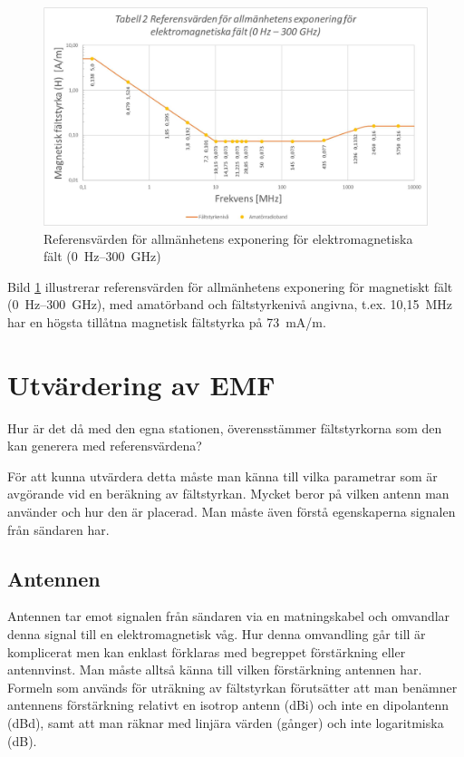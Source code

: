 \begin{figure}[h]
\begin{center}
\includegraphics[width=14cm]{images/emfbild-001}
\caption{Referensvärden för allmänhetens exponering för elektromagnetiska fält (0~Hz--300~GHz)}
\label{fig:emf2}
\end{center}
\end{figure}

Bild \ref{fig:emf2} illustrerar referensvärden för allmänhetens
exponering för magnetiskt fält (0~Hz--300~GHz), med amatörband
och fältstyrkenivå angivna, t.ex. 10,15~MHz har en högsta tillåtna
magnetisk fältstyrka på 73~mA/m.

\section{Utvärdering av EMF}

Hur är det då med den egna stationen, överensstämmer fältstyrkorna som
den kan generera med referensvärdena?

För att kunna utvärdera detta måste man känna till vilka parametrar
som är avgörande vid en beräkning av fältstyrkan.
Mycket beror på vilken antenn man använder och hur den är placerad.
Man måste även förstå egenskaperna signalen från sändaren har.

\subsection{Antennen}

Antennen tar emot signalen från sändaren via en matningskabel och
omvandlar denna signal till en elektromagnetisk våg.
Hur denna omvandling går till är komplicerat men kan enklast förklaras med
begreppet förstärkning eller antennvinst.
Man måste alltså känna till vilken förstärkning antennen har.
Formeln som används för uträkning av fältstyrkan förutsätter att man benämner
antennens förstärkning relativt en isotrop antenn (dBi) och inte en dipolantenn
(dBd), samt att man räknar med linjära värden (gånger) och inte
logaritmiska (dB).

